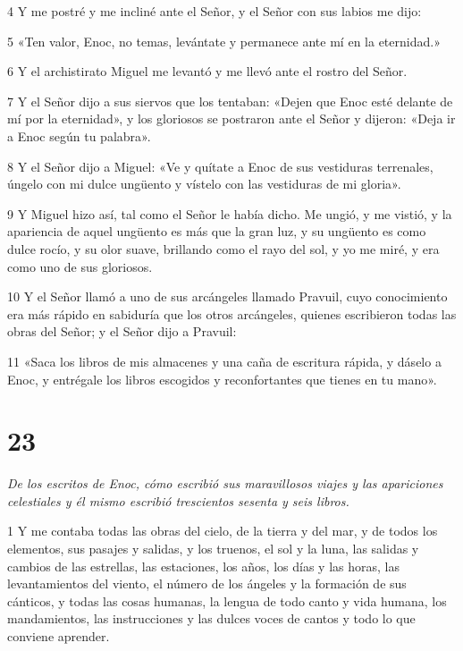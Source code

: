 \par 4 Y me postré y me incliné ante el Señor, y el Señor con sus labios me dijo:

\par 5 «Ten valor, Enoc, no temas, levántate y permanece ante mí en la eternidad.»

\par 6 Y el archistirato Miguel me levantó y me llevó ante el rostro del Señor.

\par 7 Y el Señor dijo a sus siervos que los tentaban: «Dejen que Enoc esté delante de mí por la eternidad», y los gloriosos se postraron ante el Señor y dijeron: «Deja ir a Enoc según tu palabra».

\par 8 Y el Señor dijo a Miguel: «Ve y quítate a Enoc de sus vestiduras terrenales, úngelo con mi dulce ungüento y vístelo con las vestiduras de mi gloria».

\par 9 Y Miguel hizo así, tal como el Señor le había dicho. Me ungió, y me vistió, y la apariencia de aquel ungüento es más que la gran luz, y su ungüento es como dulce rocío, y su olor suave, brillando como el rayo del sol, y yo me miré, y era como uno de sus gloriosos.

\par 10 Y el Señor llamó a uno de sus arcángeles llamado Pravuil, cuyo conocimiento era más rápido en sabiduría que los otros arcángeles, quienes escribieron todas las obras del Señor; y el Señor dijo a Pravuil:

\par 11 «Saca los libros de mis almacenes y una caña de escritura rápida, y dáselo a Enoc, y entrégale los libros escogidos y reconfortantes que tienes en tu mano».



\chapter{23}

\par \textit{De los escritos de Enoc, cómo escribió sus maravillosos viajes y las apariciones celestiales y él mismo escribió trescientos sesenta y seis libros.}

\par 1 Y me contaba todas las obras del cielo, de la tierra y del mar, y de todos los elementos, sus pasajes y salidas, y los truenos, el sol y la luna, las salidas y cambios de las estrellas, las estaciones, los años, los días y las horas, las levantamientos del viento, el número de los ángeles y la formación de sus cánticos, y todas las cosas humanas, la lengua de todo canto y vida humana, los mandamientos, las instrucciones y las dulces voces de cantos y todo lo que conviene aprender.

